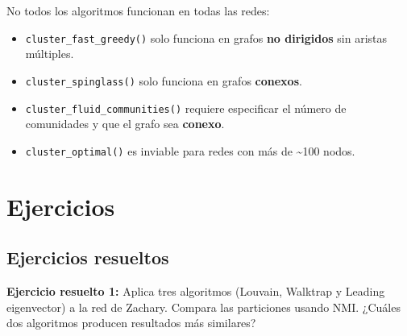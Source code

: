 \documentclass[
  letterpaper,
  DIV=11,
  numbers=noendperiod]{scrreprt}
\providecommand{\tightlist}{%
  \setlength{\itemsep}{0pt}\setlength{\parskip}{0pt}}
\begin{document}
\begin{tcolorbox}[enhanced jigsaw, toprule=.15mm, colframe=quarto-callout-warning-color-frame, coltitle=black, titlerule=0mm, colback=white, breakable, leftrule=.75mm, arc=.35mm, bottomtitle=1mm, toptitle=1mm, rightrule=.15mm, bottomrule=.15mm, left=2mm, title=\textcolor{quarto-callout-warning-color}{\faExclamationTriangle}\hspace{0.5em}{⚠️ Error frecuente}, colbacktitle=quarto-callout-warning-color!10!white, opacityback=0, opacitybacktitle=0.6]

No todos los algoritmos funcionan en todas las redes:

\begin{itemize}
\tightlist
\item
  \texttt{cluster\_fast\_greedy()} solo funciona en grafos \textbf{no
  dirigidos} sin aristas múltiples.
\item
  \texttt{cluster\_spinglass()} solo funciona en grafos
  \textbf{conexos}.
\item
  \texttt{cluster\_fluid\_communities()} requiere especificar el número
  de comunidades y que el grafo sea \textbf{conexo}.
\item
  \texttt{cluster\_optimal()} es inviable para redes con más de
  \textasciitilde100 nodos.
\end{itemize}

\end{tcolorbox}

\section{Ejercicios}\label{ejercicios-6}

\subsection*{Ejercicios resueltos}\label{ejercicios-resueltos-6}

\textbf{Ejercicio resuelto 1:} Aplica tres algoritmos (Louvain, Walktrap
y Leading eigenvector) a la red de Zachary. Compara las particiones
usando NMI. ¿Cuáles dos algoritmos producen resultados más similares?
\end{document}
